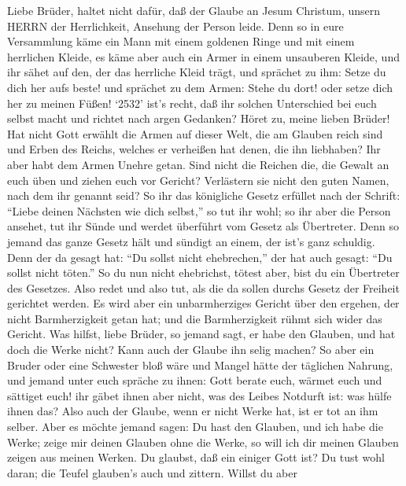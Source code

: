  Liebe Brüder, haltet nicht dafür, daß der Glaube an Jesum
Christum, unsern HERRN der Herrlichkeit, Ansehung der Person leide.
 Denn so in eure Versammlung käme ein Mann mit einem
goldenen Ringe und mit einem herrlichen Kleide, es käme aber auch ein
Armer in einem unsauberen Kleide,  und ihr sähet auf den,
der das herrliche Kleid trägt, und sprächet zu ihm: Setze du dich her
aufs beste! und sprächet zu dem Armen: Stehe du dort! oder setze dich
her zu meinen Füßen!  `2532' ist's recht, daß ihr solchen
Unterschied bei euch selbst macht und richtet nach argen Gedanken?
 Höret zu, meine lieben Brüder! Hat nicht Gott erwählt die
Armen auf dieser Welt, die am Glauben reich sind und Erben des Reichs,
welches er verheißen hat denen, die ihn liebhaben?  Ihr aber
habt dem Armen Unehre getan. Sind nicht die Reichen die, die Gewalt an
euch üben und ziehen euch vor Gericht?  Verlästern sie nicht
den guten Namen, nach dem ihr genannt seid?  So ihr das
königliche Gesetz erfüllet nach der Schrift: ``Liebe deinen Nächsten wie
dich selbst,'' so tut ihr wohl;  so ihr aber die Person
ansehet, tut ihr Sünde und werdet überführt vom Gesetz als Übertreter.
 Denn so jemand das ganze Gesetz hält und sündigt an einem,
der ist's ganz schuldig.  Denn der da gesagt hat: ``Du
sollst nicht ehebrechen,'' der hat auch gesagt: ``Du sollst nicht
töten.'' So du nun nicht ehebrichst, tötest aber, bist du ein Übertreter
des Gesetzes.  Also redet und also tut, als die da sollen
durchs Gesetz der Freiheit gerichtet werden.  Es wird aber
ein unbarmherziges Gericht über den ergehen, der nicht Barmherzigkeit
getan hat; und die Barmherzigkeit rühmt sich wider das Gericht.
 Was hilfst, liebe Brüder, so jemand sagt, er habe den
Glauben, und hat doch die Werke nicht? Kann auch der Glaube ihn selig
machen?  So aber ein Bruder oder eine Schwester bloß wäre
und Mangel hätte der täglichen Nahrung,  und jemand unter
euch spräche zu ihnen: Gott berate euch, wärmet euch und sättiget euch!
ihr gäbet ihnen aber nicht, was des Leibes Notdurft ist: was hülfe ihnen
das?  Also auch der Glaube, wenn er nicht Werke hat, ist er
tot an ihm selber.  Aber es möchte jemand sagen: Du hast
den Glauben, und ich habe die Werke; zeige mir deinen Glauben ohne die
Werke, so will ich dir meinen Glauben zeigen aus meinen Werken.
 Du glaubst, daß ein einiger Gott ist? Du tust wohl daran;
die Teufel glauben's auch und zittern.  Willst du aber
